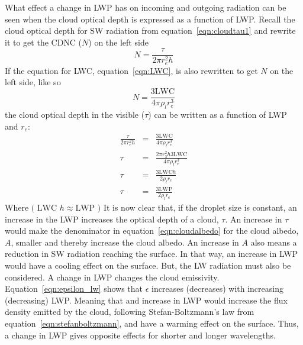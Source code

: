 What effect a change in LWP has on incoming and outgoing radiation can be seen when the cloud optical depth is expressed as a function of LWP. Recall the cloud optical depth for SW radiation from equation~\ref{eqn:cloudtau1} and rewrite it to get the CDNC ($N$) on the left side
\begin{equation}
N = \frac{\tau}{2\pi r^2_e h}
\end{equation}
If the equation for LWC, equation~\ref{eqn:LWC}, is also rewritten to get $N$ on the left side, like so
\begin{equation}
N = \frac{3\text{LWC}}{4\pi \rho_l r^3_e}
\end{equation}
the cloud optical depth in the visible ($\tau$) can be written as a function of LWP and $r_e$:
\begin{eqnarray}
\frac{\tau}{2\pi r^2_e h} &=& \frac{3\text{LWC}}{4\pi \rho_l r^3_e}\\
\tau &=& \frac{2\pi r^2_3 h 3\text{LWC}}{4\pi \rho_l r^3_e}\\
\tau &=& \frac{3\text{LWC} h}{2\rho_l r_e}\\
\tau &=& \frac{3\text{LWP}}{2\rho_l r_e}
\label{eqn:cloudtau}
\end{eqnarray}
Where $\text{( LWC }h \approx \text{LWP )}$
It is now clear that, if the droplet size is constant, an increase in the LWP increases the optical depth of a cloud, $\tau$. An increase in $\tau$ would make the denominator in equation~\ref{eqn:cloudalbedo} for the cloud albedo, $A$, smaller and thereby increase the cloud albedo. An increase in $A$ also means a reduction in SW radiation reaching the surface. In that way, an increase in LWP would have a cooling effect on the surface. But, the LW radiation must also be considered. A change in LWP changes the cloud emissivity. Equation~\ref{eqn:epsilon_lw} shows that $\epsilon$ increases (decreases) with increasing (decreasing) LWP. Meaning that and increase in LWP would increase the flux density emitted by the cloud, following Stefan-Boltzmann's law from equation~\ref{eqn:stefanboltzmann}, and have a warming effect on the surface. Thus, a change in LWP gives opposite effects for shorter and longer wavelengths.

